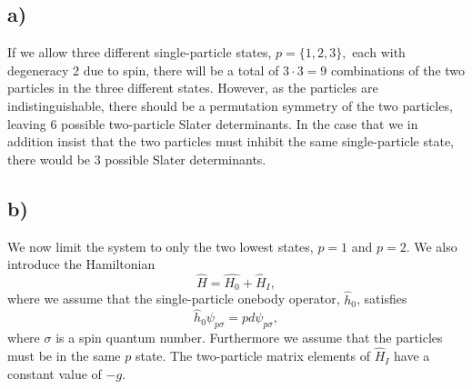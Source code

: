 \documentclass[a4paper, 11pt, notitlepage, english]{article}
\newcommand{\bra}[1]{\langle #1|}
\newcommand{\ket}[1]{|#1 \rangle}
\newcommand{\op}[1]{\hat{#1}}
\newcommand{\braopket}[3]{\langle #1 | {#2} | #3 \rangle}
\begin{document}


\subsection*{a)}
If we allow three different single-particle states, $p=\{1,2,3\},$ each with degeneracy 2 due to spin, there will be a total of $3\cdot 3 = 9$ combinations of the two particles in the three different states. However, as the particles are indistinguishable, there should be a permutation symmetry of the two particles, leaving 6 possible two-particle Slater determinants. In the case that we in addition insist that the two particles must inhibit the same single-particle state, there would be 3 possible Slater determinants.


\subsection*{b)}
We now limit the system to only the two lowest states, $p=1$ and $p=2$. We also introduce the Hamiltonian
$$\op{H} = \op{H_0} + \op{H}_I,$$
where we assume that the single-particle onebody operator, $\op{h}_0$, satisfies
$$\op{h}_0 \psi_{p\sigma} = pd \psi_{p\sigma},$$
where $\sigma$ is a spin quantum number. Furthermore we assume that the particles must be in the same $p$ state. The two-particle matrix elements of $\op{H}_I$ have a constant value of $-g$. 
\end{document}
